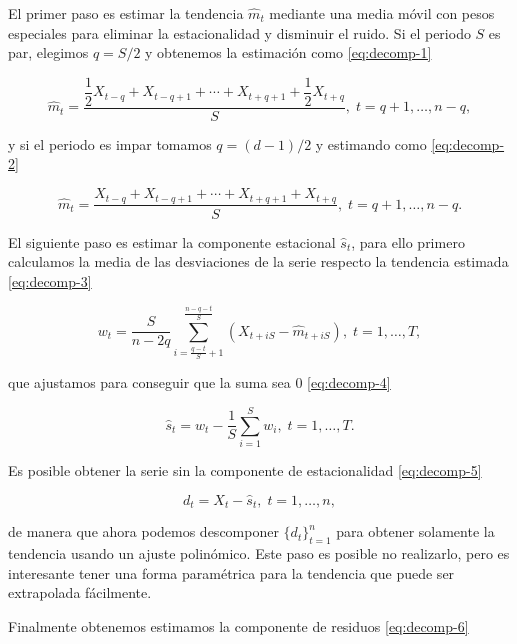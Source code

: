 El primer paso es estimar la tendencia $\hat{m}_t$ mediante una media móvil con pesos especiales para eliminar la estacionalidad y disminuir el ruido. Si el periodo $S$ es par, elegimos $q = S / 2$ y obtenemos la estimación como \eqref{eq:decomp-1}

\begin{equation}
  \hat{m}_t = \dfrac{\dfrac{1}{2}X_{t - q} + X_{t-q+1} + \cdots + X_{t+q+1} + \dfrac{1}{2}X_{t + q}}{S}, \; t = q + 1, \ldots, n - q,
  \label{eq:decomp-1}
\end{equation}

y si el periodo es impar tomamos $q = (d-1)/2$ y estimando como \eqref{eq:decomp-2}

\begin{equation}
  \hat{m}_t = \dfrac{X_{t - q} + X_{t-q+1} + \cdots + X_{t+q+1} + X_{t + q}}{S}, \; t = q + 1, \ldots, n - q.
  \label{eq:decomp-2}
\end{equation}

El siguiente paso es estimar la componente estacional $\hat{s}_t$, para ello primero calculamos la media de las desviaciones de la serie respecto la tendencia estimada \eqref{eq:decomp-3}

\begin{equation}
  w_t = \dfrac{S}{n - 2q} \sum \limits^{\frac{n - q - t}{S}}_{i = \frac{q - t}{S} + 1} \left(X_{t + iS} - \hat{m}_{t + iS}\right), \; t = 1, \ldots, T,
  \label{eq:decomp-3}
\end{equation}

que ajustamos para conseguir que la suma sea 0 \eqref{eq:decomp-4}

\begin{equation}
  \hat{s}_t = w_t - \dfrac{1}{S}\sum \limits^S_{i = 1} w_i, \; t = 1, \ldots, T.
  \label{eq:decomp-4}
\end{equation}

Es posible obtener la serie sin la componente de estacionalidad \eqref{eq:decomp-5}

\begin{equation}
  d_t = X_t - \hat{s}_t, \; t = 1, \ldots, n,
  \label{eq:decomp-5}
\end{equation}

de manera que ahora podemos descomponer $\{d_t\}_{t = 1}^n$ para obtener solamente la tendencia usando un ajuste polinómico. Este paso es posible no realizarlo, pero es interesante tener una forma paramétrica para la tendencia que puede ser extrapolada fácilmente.

Finalmente obtenemos estimamos la componente de residuos \eqref{eq:decomp-6}


